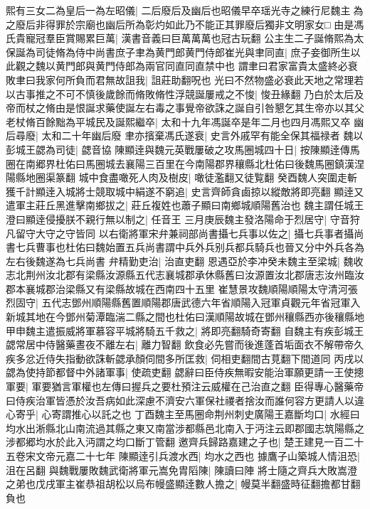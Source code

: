熙有三女二為皇后一為左昭儀|{
	二后廢后及幽后也昭儀早卒瑶光寺之練行尼魏主為之廢后非得罪於宗廟也幽后所為彰灼如此乃不能正其罪廢后獨非文明家女□}
由是馮氏貴寵冠羣臣賞賜累巨萬|{
	漢書音義曰巨萬萬萬也冠古玩翻}
公主生二子誕脩熙為太保誕為司徒脩為侍中尚書庶子聿為黄門郎黄門侍郎崔光與聿同直|{
	庶子妾御所生以此觀之魏以黄門郎與黄門侍郎為兩官同直同直禁中也}
謂聿曰君家富貴太盛終必衰敗聿曰我家何所負而君無故詛我|{
	詛莊助翻呪也}
光曰不然物盛必衰此天地之常理若以古事推之不可不慎後歲餘而脩敗脩性浮競誕屢戒之不悛|{
	悛丑緣翻}
乃白於太后及帝而杖之脩由是恨誕求藥使誕左右毒之事覺帝欲誅之誕自引咎懇乞其生帝亦以其父老杖脩百餘黜為平城民及誕熙繼卒|{
	太和十九年馮誕卒是年二月也四月馮熙又卒}
幽后尋廢|{
	太和二十年幽后廢}
聿亦擯棄馮氏遂衰|{
	史言外戚罕有能全保其福禄者}
魏以彭城王勰為司徒|{
	勰音協}
陳顯逹與魏元英戰屢破之攻馬圈城四十日|{
	按陳顯逹傳馬圈在南郷界杜佑曰馬圈城去襄陽三百里在今南陽郡界穰縣北杜佑曰後魏馬圈鎮漢涅陽縣地圈渠篆翻}
城中食盡噉死人肉及樹皮|{
	噉徒濫翻又徒覧翻}
癸酉魏人突圍走斬獲千計顯逹入城將士競取城中絹遂不窮追|{
	史言齊師貪鹵掠以縱敵將即亮翻}
顯逹又遣軍主莊丘黑進擊南鄉拔之|{
	莊丘複姓也蕭子顯曰南鄉城順陽舊治也}
魏主謂任城王澄曰顯逹侵擾朕不親行無以制之|{
	任音王}
三月庚辰魏主發洛陽命于烈居守|{
	守音狩凡留守大守之守皆同}
以右衛將軍宋弁兼祠部尚書攝七兵事以佐之|{
	攝七兵事者攝尚書七兵曹事也杜佑曰魏始置五兵尚書謂中兵外兵别兵都兵騎兵也晉又分中外兵各為左右後魏遂為七兵尚書}
弁精勤吏治|{
	治直吏翻}
恩遇亞於李冲癸未魏主至梁城|{
	魏收志北荆州汝北郡有梁縣汝源縣五代志襄城郡承休縣舊曰汝源置汝北郡唐志汝州臨汝郡本襄城郡治梁縣又有梁縣故城在西南四十五里}
崔慧景攻魏順陽順陽太守清河張烈固守|{
	五代志鄧州順陽縣舊置順陽郡唐武德六年省順陽入冠軍貞觀元年省冠軍入新城其地在今鄧州菊潭臨湍二縣之間也杜佑曰漢順陽故城在鄧州穰縣西亦後穰縣地}
甲申魏主遣振威將軍慕容平城將騎五千救之|{
	將即亮翻騎奇寄翻}
自魏主有疾彭城王勰常居中侍醫藥晝夜不離左右|{
	離力智翻}
飲食必先嘗而後進蓬首垢面衣不解帶帝久疾多忿近侍失指動欲誅斬勰承顏伺間多所匡救|{
	伺相吏翻間古莧翻下間道同}
丙戌以勰為使持節都督中外諸軍事|{
	使疏吏翻}
勰辭曰臣侍疾無暇安能治軍願更請一王使摠軍要|{
	軍要猶言軍權也左傳曰握兵之要杜預注云威權在己治直之翻}
臣得專心醫藥帝曰侍疾治軍皆憑於汝吾病如此深慮不濟安六軍保社禝者捨汝而誰何容方更請人以違心寄乎|{
	心寄謂推心以託之也}
丁酉魏主至馬圈命荆州刺史廣陽王嘉斷均口|{
	水經曰均水出淅縣北山南流過其縣之東又南當涉都縣邑北南入于沔注云即郡國志筑陽縣之涉都郷均水於此入沔謂之均口斷丁管翻}
邀齊兵歸路嘉建之子也|{
	楚王建見一百二十五卷宋文帝元嘉二十七年}
陳顯逹引兵渡水西|{
	均水之西也}
據鷹子山築城人情沮恐|{
	沮在呂翻}
與魏戰屢敗魏武衛將軍元嵩免胄䧟陳|{
	陳讀曰陣}
將士隨之齊兵大敗嵩澄之弟也戊戌軍主崔恭祖胡松以烏布幔盛顯逹數人擔之|{
	幔莫半翻盛時征翻擔都甘翻負也}

